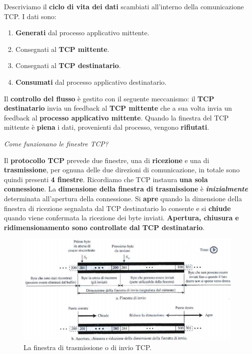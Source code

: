 \documentclass[11pt,a4paper]{article}
\theoremstyle{definition}
\begin{document}
Descriviamo il \textbf{ciclo di vita dei dati} scambiati all'interno della comunicazione TCP. I dati sono:
\begin{enumerate}
	\item \textbf{Generati} dal processo applicativo mittente.
	\item Consegnati al \textbf{TCP mittente}.
	\item Consegnati al \textbf{TCP destinatario}.
	\item \textbf{Consumati} dal processo applicativo destinatario.
\end{enumerate}
Il \textbf{controllo del flusso} è gestito con il seguente meccanismo: il \textbf{TCP destinatario} invia un feedback al \textbf{TCP mittente} che a sua volta invia un feedback al \textbf{processo applicativo mittente}. Quando la finestra del TCP mittente è \textbf{piena} i dati, provenienti dal processo, vengono \textbf{rifiutati}.
\newpage
\begin{flushleft}
	\textit{Come funzionano le finestre TCP?}
\end{flushleft}
Il \textbf{protocollo TCP} prevede due finestre, una di \textbf{ricezione} e una di \textbf{trasmissione}, per ognuna delle due direzioni di comunicazione, in totale sono quindi presenti \textbf{4 finestre}. Ricordiamo che TCP instaura \textbf{una sola connessione}. La \textbf{dimensione della finestra di trasmissione} è \textit{\textbf{inizialmente}} determinata all'apertura della connessione. Si \textbf{apre} quando la dimensione della finestra di ricezione segnalata dal TCP destinatario lo consente e si \textbf{chiude} quando viene confermata la ricezione dei byte inviati. \textbf{Apertura, chiusura e ridimensionamento sono controllate dal TCP destinatario}.
\begin{figure}[!h]
	\includegraphics[scale=0.55]{Immagini/TCP_Window.png}
	\centering
	\caption{La finestra di trasmissione o di invio TCP.}
\end{figure}\newline
\end{document}
